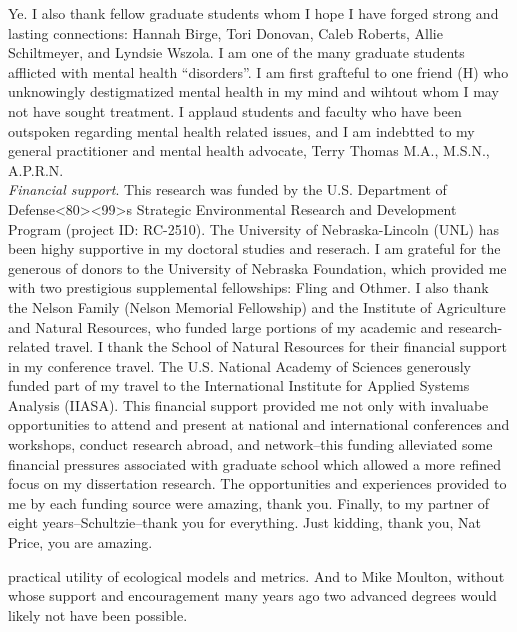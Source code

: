 \documentclass[12pt,twoside,openany]{reedthesis}
\begin{document}
Ye. I also thank fellow graduate students whom I hope I have forged
strong and lasting connections: Hannah Birge, Tori Donovan, Caleb
Roberts, Allie Schiltmeyer, and Lyndsie Wszola. I am one of the many
graduate students afflicted with mental health ``disorders''. I am first
grafteful to one friend (H) who unknowingly destigmatized mental health
in my mind and wihtout whom I may not have sought treatment. I applaud
students and faculty who have been outspoken regarding mental health
related issues, and I am indebtted to my general practitioner and mental
health advocate, Terry Thomas M.A., M.S.N., A.P.R.N.\\
\emph{Financial support}. This research was funded by the U.S.
Department of
Defense\textless{}80\textgreater{}\textless{}99\textgreater{}s Strategic
Environmental Research and Development Program (project ID: RC-2510).
The University of Nebraska-Lincoln (UNL) has been highy supportive in my
doctoral studies and reserach. I am grateful for the generous of donors
to the University of Nebraska Foundation, which provided me with two
prestigious supplemental fellowships: Fling and Othmer. I also thank the
Nelson Family (Nelson Memorial Fellowship) and the Institute of
Agriculture and Natural Resources, who funded large portions of my
academic and research-related travel. I thank the School of Natural
Resources for their financial support in my conference travel. The U.S.
National Academy of Sciences generously funded part of my travel to the
International Institute for Applied Systems Analysis (IIASA). This
financial support provided me not only with invaluabe opportunities to
attend and present at national and international conferences and
workshops, conduct research abroad, and network--this funding alleviated
some financial pressures associated with graduate school which allowed a
more refined focus on my dissertation research. The opportunities and
experiences provided to me by each funding source were amazing, thank
you. Finally, to my partner of eight years--Schultzie--thank you for
everything. Just kidding, thank you, Nat Price, you are amazing.
%

  \hypersetup{linkcolor=black}
  \setcounter{tocdepth}{2}
  \tableofcontents

  \listoftables

  \listoffigures


practical utility of ecological models and metrics. And to Mike Moulton,
without whose support and encouragement many years ago two advanced
degrees would likely not have been possible.
%
\mainmatter %
\pagestyle{fancyplain} %
\doublespacing{} %
\end{document}
